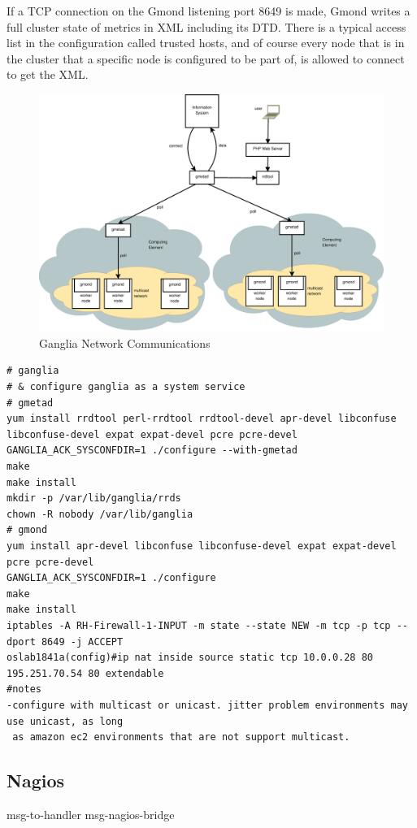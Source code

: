 If a TCP connection on the Gmond listening port 8649 is made, Gmond writes a full cluster state of metrics in XML including its DTD. There is a typical access list in the configuration called trusted hosts, and of course every node that is in the cluster that a specific node is configured to be part of, is allowed to connect to get the XML.

\begin{figure}[htb]
\centering
 \includegraphics[width=6in]{images/ganglia_data_flow.eps}
\caption{Ganglia Network Communications}
\label{figure:ganglia_network}
\end{figure}

\begin{verbatim}
# ganglia
# & configure ganglia as a system service
# gmetad
yum install rrdtool perl-rrdtool rrdtool-devel apr-devel libconfuse libconfuse-devel expat expat-devel pcre pcre-devel
GANGLIA_ACK_SYSCONFDIR=1 ./configure --with-gmetad
make
make install
mkdir -p /var/lib/ganglia/rrds
chown -R nobody /var/lib/ganglia
# gmond
yum install apr-devel libconfuse libconfuse-devel expat expat-devel pcre pcre-devel
GANGLIA_ACK_SYSCONFDIR=1 ./configure
make
make install
iptables -A RH-Firewall-1-INPUT -m state --state NEW -m tcp -p tcp --dport 8649 -j ACCEPT
oslab1841a(config)#ip nat inside source static tcp 10.0.0.28 80 195.251.70.54 80 extendable       
#notes
-configure with multicast or unicast. jitter problem environments may use unicast, as long
 as amazon ec2 environments that are not support multicast.
\end{verbatim}

\newpage

\subsection{Nagios}
msg-to-handler msg-nagios-bridge
\newpage

